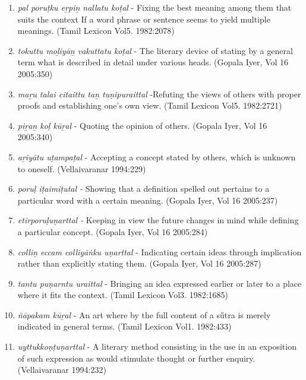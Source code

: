 \begin{enumerate}
 \item \textit{pal poruṭku eṟpiṉ nallatu koṭal} - Fixing the best meaning among them that suits the context If a word phrase or sentence seems to yield multiple meanings. (Tamil Lexicon Vol5. 1982:2078)

 \item \textit{tokuttu moḻiyāṉ vakuttatu koṭal} - The literary device of stating by a general term what is described in detail under various heads. (Gopala Iyer, Vol 16 2005:350)

 \item \textit{maṟu talai citaittu taṉ tuṇipuraittal} -Refuting the views of others with proper proofs and establishing one’s own view. (Tamil Lexicon Vol5. 1982:2721)

 \item \textit{piṟaṉ koḷ kūṟal} - Quoting the opinion of others. (Gopala Iyer, Vol 16 2005:340)

 \item \textit{ aṟiyātu uṭampaṭal} - Accepting a concept stated by others, which is unknown to oneself. (Vellaivaranar 1994:229)

 \item \textit{poruḷ iṭaimiṭutal -} Showing that a definition spelled out pertains to a particular word with a certain meaning. (Gopala Iyer, Vol 16 2005:237) 

 \item \textit{etirporuḷuṇarttal -} Keeping in view the future changes in mind while defining a particular concept. (Gopala Iyer, Vol 16 2005:284)

 \item \textit{colliṉ eccam colliyāṅku uṇarttal} - Indicating certain ideas through implication rather than explicitly stating them. (Gopala Iyer, Vol 16 2005:287)

 \item \textit{tantu puṇarntu uraittal} - Bringing an idea expressed earlier or later to a place where it fits the context. (Tamil Lexicon Vol3. 1982:1685)

 \item \textit{ñāpakam kūṟal} - An art where by the full content of a sűtra is merely indicated in general terms. (Tamil Lexicon Vol1. 1982:433)

 \item \textit{uyttukkoṇṭuṇarttal} - A literary method consisting in the use in an exposition of such expression as would stimulate thought or further enquiry. (Vellaivaranar 1994:232)

\end{enumerate}

